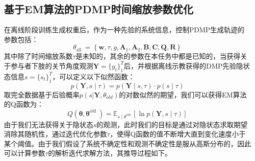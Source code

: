 \subsection{基于EM算法的PDMP时间缩放参数优化}
在离线阶段训练生成权重后，作为一种先验的系统信息，控制PDMP生成轨迹的参数包括：
\begin{equation}
    \theta_{\text {all }}=\left\{\mathbf{w}, \tau, g, \mathbf{A}_1, \mathbf{A}_2, \mathbf{B}, \mathbf{C}, \mathbf{Q}, \mathbf{R}\right\}
\end{equation}
其中除了时间缩放系数$\tau$是未知的，其余的参数在本任务中都是已知的，当获得关于参与者下肢的关节角度观测$\mathbf{Y}=\{ y_t\}_1^T$后，并根据离线示教获得的DMP先验隐状态信息$s=\{s_t\}_1^T$，可以定义以下似然函数：
\begin{equation}
    p(\mathbf{Y}, s \mid \tau) = 
    p(\mathbf{Y} \mid  s, \tau) \cdot p(s \mid  \tau)
    \label{eq:4-21}
\end{equation}
取完全数据基于后验概率$p(s|\mathbf{Y},\theta_{old})$的对数似然的期望，我们可以获得EM算法的Q函数为：
\begin{equation}
    Q\left(\boldsymbol{\theta}, \boldsymbol{\theta}^{\text {old }}\right)=\mathbb{E}_{s \mid \theta^{\text {old }}}[\ln p(\mathbf{Y}, s \mid \tau)]
\end{equation}
由于我们无法获得关于隐状态$s$的观测，此时我们的目标是通过对隐状态求取期望消除其随机性，通过迭代优化参数$\tau$，使得Q函数的值不断增大直到变化速度小于某个阈值。由于我们假设了系统不确定性和观测不确定性是服从高斯分布的，因此可以计算参数$\tau$的解析迭代求解方法，其推导过程如下。

